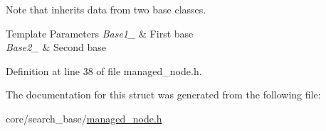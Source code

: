 Note that inherits data from two base classes. 


\begin{DoxyTemplParams}{Template Parameters}
{\em Base1\+\_\+} & First base \\
\hline
{\em Base2\+\_\+} & Second base \\
\hline
\end{DoxyTemplParams}


Definition at line 38 of file managed\+\_\+node.\+h.



The documentation for this struct was generated from the following file\+:\begin{DoxyCompactItemize}
\item 
core/search\+\_\+base/\hyperlink{managed__node_8h}{managed\+\_\+node.\+h}\end{DoxyCompactItemize}

